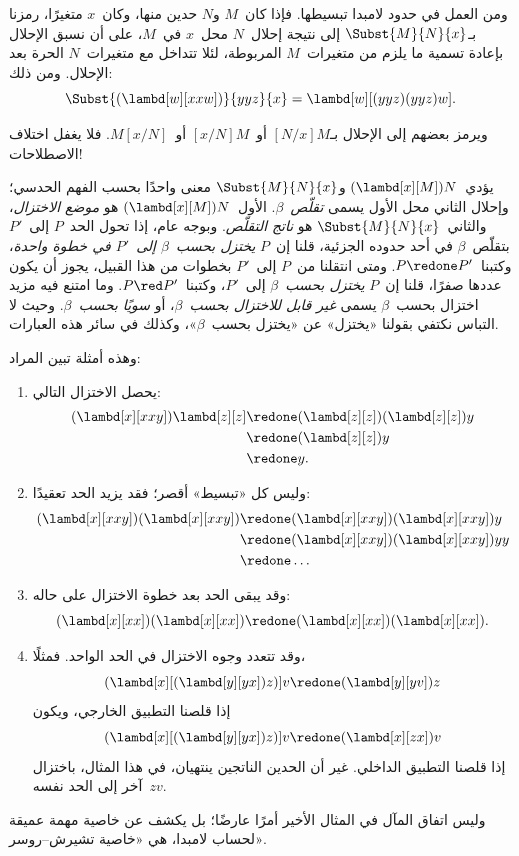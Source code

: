 \documentclass[../../../include/open-logic-section]{subfiles}
\begin{document}

ومن العمل في حدود لامبدا تبسيطها. فإذا كان~$M$ و$N$ حدين منها،
وكان~$x$ متغيرًا، رمزنا بـ$\Subst{M}{N}{x}$ إلى نتيجة إحلال~$N$
محل~$x$ في~$M$، على أن نسبق الإحلال بإعادة تسمية ما يلزم من
متغيرات~$M$ المربوطة، لئلا تتداخل مع متغيرات~$N$ الحرة بعد
الإحلال. ومن ذلك:
\[
\Subst{(\lambd[w][xxw])}{yyz}{x} = \lambd[w][(yyz)(yyz)w].
\]

\begin{digress}
ويرمز بعضهم إلى الإحلال بـ$[N/x]M$ أو~$[x/N]M$ أو~$M[x/N]$.
فلا يغفل اختلاف الاصطلاحات!
\end{digress}

يؤدي~$(\lambd[x][M])N$ و$\Subst{M}{N}{x}$ معنى واحدًا بحسب
الفهم الحدسي؛ وإحلال الثاني محل الأول يسمى \emph{تقلّص~$\beta$}.
الأول~$(\lambd[x][M])N$ هو \emph{موضع الاختزال}،
والثاني~$\Subst{M}{N}{x}$ هو \emph{ناتج التقلّص}.
وبوجه عام، إذا تحول الحد~$P$ إلى~$P'$ بتقلّص~$\beta$ في
أحد حدوده الجزئية، قلنا إن~$P$ \emph{يختزل بحسب~$\beta$
إلى~$P'$ في خطوة واحدة}، وكتبنا~$P \redone P'$.
ومتى انتقلنا من~$P$ إلى~$P'$ بخطوات من هذا القبيل،
يجوز أن يكون عددها صفرًا، قلنا إن~$P$ \emph{يختزل بحسب~$\beta$}
إلى~$P'$، وكتبنا~$P \red P'$.
وما امتنع فيه مزيد اختزال بحسب~$\beta$ يسمى
\emph{غير قابل للاختزال بحسب~$\beta$}، أو \emph{سويًا بحسب~$\beta$}.
وحيث لا التباس نكتفي بقولنا «يختزل» عن «يختزل بحسب~$\beta$»،
وكذلك في سائر هذه العبارات.

وهذه أمثلة تبين المراد:
\begin{enumerate}
\item يحصل الاختزال التالي:
\begin{align*}
(\lambd[x][xxy]) \lambd[z][z] & \redone (\lambd[z][z])(\lambd[z][z]) y \\
& \redone (\lambd[z][z]) y \\
& \redone y.
\end{align*}
\item وليس كل «تبسيط» أقصر؛ فقد يزيد الحد تعقيدًا:
\begin{align*}
(\lambd[x][xxy])(\lambd[x][xxy]) & \redone (\lambd[x][xxy])(\lambd[x][xxy])y \\
& \redone (\lambd[x][xxy])(\lambd[x][xxy])yy \\
& \redone \dots
\end{align*}
\item وقد يبقى الحد بعد خطوة الاختزال على حاله:
\[
(\lambd[x][xx])(\lambd[x][xx]) \redone (\lambd[x][xx])(\lambd[x][xx]).
\]
\item وقد تتعدد وجوه الاختزال في الحد الواحد. فمثلًا،
\[
(\lambd[x][(\lambd[y][yx]) z)] v \redone (\lambd[y][yv]) z
\]
إذا قلصنا التطبيق الخارجي، ويكون
\[
(\lambd[x][(\lambd[y][yx]) z)] v \redone (\lambd[x][zx]) v
\]
إذا قلصنا التطبيق الداخلي. غير أن الحدين الناتجين ينتهيان،
في هذا المثال، باختزال آخر إلى الحد نفسه~$zv$.
\end{enumerate}

وليس اتفاق المآل في المثال الأخير أمرًا عارضًا؛ بل يكشف
عن خاصية مهمة عميقة لحساب لامبدا، هي «خاصية تشيرش--روسر».
\end{document}

